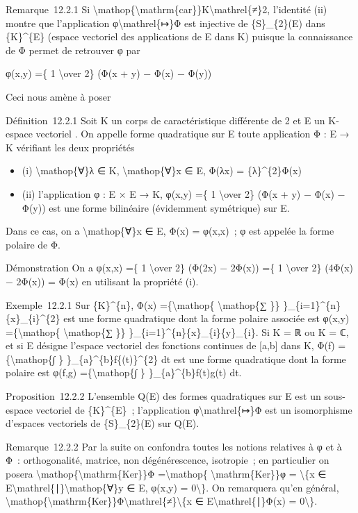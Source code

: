\documentclass[]{article}
\begin{document}
Remarque~12.2.1 Si
\textbackslash{}mathop\{\textbackslash{}mathrm\{car\}\}K\textbackslash{}mathrel\{≠\}2,
l'identité (ii) montre que l'application φ\textbackslash{}mathrel\{↦\}Φ
est injective de \{S\}\_\{2\}(E) dans \{K\}\^{}\{E\} (espace vectoriel
des applications de E dans K) puisque la connaissance de Φ permet de
retrouver φ par

φ(x,y) =\{ 1 \textbackslash{}over 2\} (Φ(x + y) − Φ(x) − Φ(y))

Ceci nous amène à poser

Définition~12.2.1 Soit K un corps de caractéristique différente de 2 et
E un K-espace vectoriel . On appelle forme quadratique sur E toute
application Φ : E → K vérifiant les deux propriétés

\begin{itemize}
\itemsep1pt\parskip0pt
\item
  (i) \textbackslash{}mathop\{∀\}λ ∈ K, \textbackslash{}mathop\{∀\}x ∈
  E, Φ(λx) = \{λ\}\^{}\{2\}Φ(x)
\item
  (ii) l'application φ : E × E → K, φ(x,y) =\{ 1 \textbackslash{}over
  2\} (Φ(x + y) − Φ(x) − Φ(y)) est une forme bilinéaire (évidemment
  symétrique) sur E.
\end{itemize}

Dans ce cas, on a \textbackslash{}mathop\{∀\}x ∈ E, Φ(x) = φ(x,x)~; φ
est appelée la forme polaire de Φ.

Démonstration On a φ(x,x) =\{ 1 \textbackslash{}over 2\} (Φ(2x) − 2Φ(x))
=\{ 1 \textbackslash{}over 2\} (4Φ(x) − 2Φ(x)) = Φ(x) en utilisant la
propriété (i).

Exemple~12.2.1 Sur \{K\}\^{}\{n\}, Φ(x) =\{\textbackslash{}mathop\{
\textbackslash{}mathop\{∑ \}\} \}\_\{i=1\}\^{}\{n\}\{x\}\_\{i\}\^{}\{2\}
est une forme quadratique dont la forme polaire associée est φ(x,y)
=\{\textbackslash{}mathop\{ \textbackslash{}mathop\{∑ \}\}
\}\_\{i=1\}\^{}\{n\}\{x\}\_\{i\}\{y\}\_\{i\}. Si K = ℝ ou K = ℂ, et si E
désigne l'espace vectoriel des fonctions continues de {[}a,b{]} dans K,
Φ(f) =\{\textbackslash{}mathop\{∫ \} \}\_\{a\}\^{}\{b\}f\{(t)\}\^{}\{2\}
dt est une forme quadratique dont la forme polaire est φ(f,g)
=\{\textbackslash{}mathop\{∫ \} \}\_\{a\}\^{}\{b\}f(t)g(t) dt.

Proposition~12.2.2 L'ensemble Q(E) des formes quadratiques sur E est un
sous-espace vectoriel de \{K\}\^{}\{E\}~; l'application
φ\textbackslash{}mathrel\{↦\}Φ est un isomorphisme d'espaces vectoriels
de \{S\}\_\{2\}(E) sur Q(E).

Remarque~12.2.2 Par la suite on confondra toutes les notions relatives à
φ et à Φ~: orthogonalité, matrice, non dégénérescence, isotropie~; en
particulier on posera
\textbackslash{}mathop\{\textbackslash{}mathrm\{Ker\}\}Φ
=\textbackslash{}mathop\{ \textbackslash{}mathrm\{Ker\}\}φ =
\textbackslash{}\{x ∈
E\textbackslash{}mathrel\{∣\}\textbackslash{}mathop\{∀\}y ∈ E, φ(x,y) =
0\textbackslash{}\}. On remarquera qu'en général,
\textbackslash{}mathop\{\textbackslash{}mathrm\{Ker\}\}Φ\textbackslash{}mathrel\{≠\}\textbackslash{}\{x
∈ E\textbackslash{}mathrel\{∣\}Φ(x) = 0\textbackslash{}\}.
\end{document}
